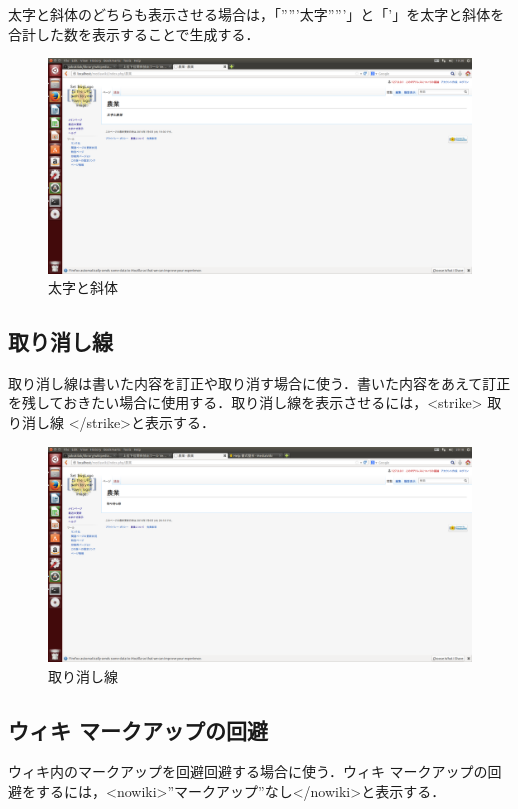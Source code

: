 太字と斜体のどちらも表示させる場合は，「'''''太字'''''」と「'」を太字と斜体を合計した数を表示することで生成する．

\begin{figure}[htb]
\centering
\includegraphics[width=14cm]{hutosya}
\caption{太字と斜体}\label{図}
\end{figure}


\subsection{取り消し線}
取り消し線は書いた内容を訂正や取り消す場合に使う．書いた内容をあえて訂正を残しておきたい場合に使用する．取り消し線を表示させるには，<strike> 取り消し線 </strike>と表示する．

\begin{figure}[htb]
\centering
\includegraphics[width=14cm]{torikesi}
\caption{取り消し線}\label{図}
\end{figure}

\subsection{ウィキ マークアップの回避}
ウィキ内のマークアップを回避回避する場合に使う．ウィキ マークアップの回避をするには，<nowiki>''マークアップ''なし</nowiki>と表示する．

